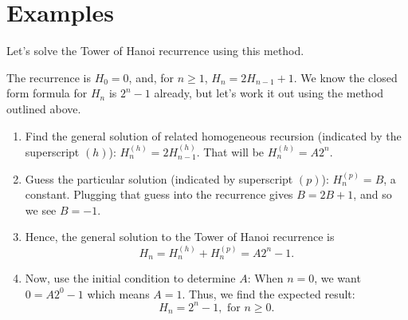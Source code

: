 \section{Examples}
\begin{exmp}
 Let's solve the Tower of Hanoi recurrence using this
 method.
 
 The recurrence is $H_0=0$, and, for $n\geq 1$, $H_n = 2H_{n-1}+1$.
 We know the closed form formula for $H_n$ is $2^n-1$ already, but let's
 work it out using the method outlined above.
 \begin{enumerate}[label=Step (\arabic*):]
   \item Find the general solution of related homogeneous recursion 
   (indicated by the superscript $(h)$):
   $H_n^{(h)} = 2H_{n-1}^{(h)}$. That will be $H_n^{(h)} = A2^n$.
   
   \item Guess the particular solution (indicated by superscript $(p)$): 
   $H_n^{(p)} = B$, a constant. Plugging that guess into the
   recurrence gives  $B = 2B+1$, and so we see $B=-1$.
   
   \item Hence, the general solution to the Tower of Hanoi recurrence is
   \[
    H_n = H_n^{(h)}+H_n^{(p)} = A2^n -1.
   \]
   
   \item Now, use the initial condition to determine $A$: When $n=0$, we
   want
   $0 = A2^0-1$ which means $A=1$. Thus, we find the expected result:
   \[
    H_n = 2^n-1, \text{ for $n\geq 0$}.
   \]
 \end{enumerate}
\end{exmp}


